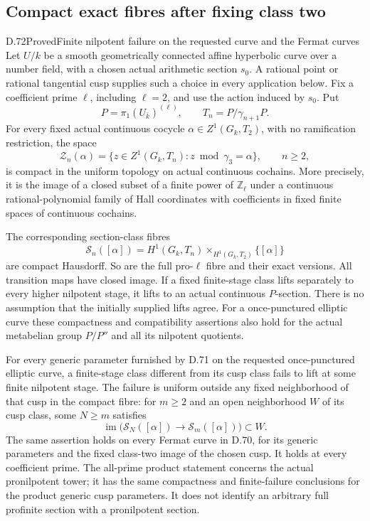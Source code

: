 \subsection{Compact exact fibres after fixing class two}

\begin{statement}{D.72}{Proved}{Finite nilpotent failure on the requested curve and the Fermat curves}
Let \(U/k\) be a smooth geometrically connected affine hyperbolic
curve over a number field, with a chosen actual arithmetic section
\(s_0\). A rational point or rational tangential cusp supplies such
a choice in every application below. Fix a coefficient prime
\(\ell\), including \(\ell=2\), and use the action induced by \(s_0\).
Put
\[
 P=\pi_1(U_{\bar k})^{(\ell)},\qquad
 T_n=P/\gamma_{n+1}P.
                                                        \tag{D.72.1}
\]
For every fixed actual continuous cocycle
\(\alpha\in Z^1(G_k,T_2)\), with no ramification restriction,
the space
\[
 {\mathscr Z}_n(\alpha)=
   \{z\in Z^1(G_k,T_n):z\bmod\gamma_3=\alpha\},
                 \qquad n\ge2,                         \tag{D.72.2}
\]
is compact in the uniform topology on actual continuous cochains.
More precisely, it is the image of a closed subset of a finite
power of \(\mathbb Z_\ell\) under a continuous rational-polynomial
family of Hall coordinates with coefficients in fixed finite
spaces of continuous cochains.

The corresponding section-class fibres
\[
 {\mathscr S}_n([\alpha])=
   H^1(G_k,T_n)\mathbin{\times}_{H^1(G_k,T_2)}\{[\alpha]\}
                                                        \tag{D.72.3}
\]
are compact Hausdorff. So are the full pro-\(\ell\) fibre and
their exact versions. All transition maps have closed image.
If a fixed finite-stage class lifts separately to every higher
nilpotent stage, it lifts to an actual continuous \(P\)-section.
There is no assumption that the initially supplied lifts agree.
For a once-punctured elliptic curve these compactness and
compatibility assertions also hold for the actual metabelian
group \(P/P''\) and all its nilpotent quotients.

For every generic parameter furnished by D.71 on the requested
once-punctured elliptic curve, a finite-stage class different
from its cusp class fails to lift at some finite nilpotent stage.
The failure is uniform outside any fixed neighborhood of that
cusp in the compact fibre: for \(m\ge2\) and an open neighborhood
\(W\) of its cusp class, some \(N\ge m\) satisfies
\[
  \operatorname{im}\bigl({\mathscr S}_N([\alpha])
            \longrightarrow{\mathscr S}_m([\alpha])\bigr)
                      \subset W.                       \tag{D.72.4}
\]
The same assertion holds on every Fermat curve in D.70, for
its generic parameters and the fixed class-two image of the
chosen cusp. It holds at every coefficient prime. The all-prime
product statement concerns the actual pronilpotent tower; it
has the same compactness and finite-failure conclusions for
the product generic cusp parameters. It does not identify an
arbitrary full profinite section with a pronilpotent section.


\end{statement}
